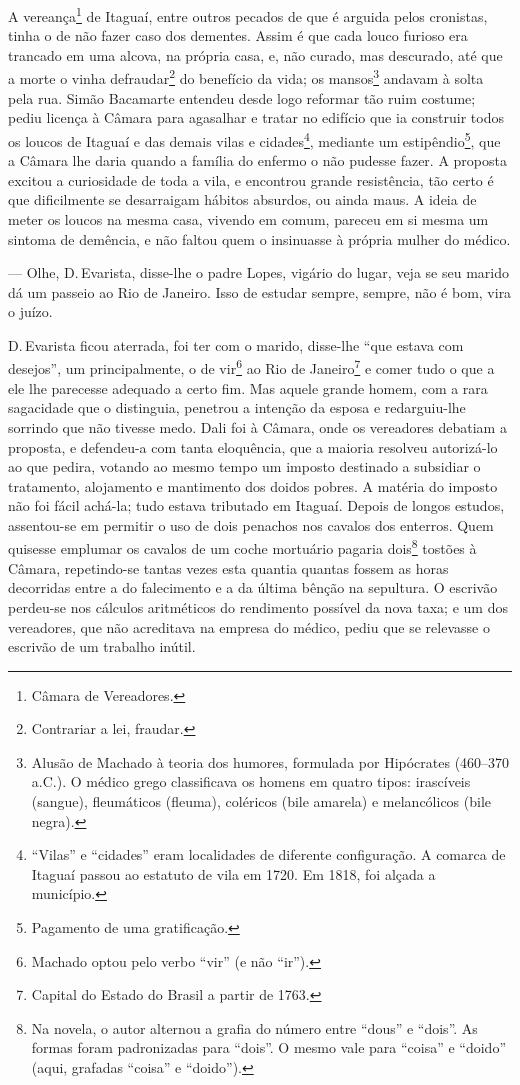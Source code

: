 A vereança\footnote{Câmara de Vereadores.} de Itaguaí, entre outros
pecados de que é arguida pelos cronistas, tinha o de não fazer caso dos
dementes. Assim é que cada louco furioso era trancado em uma alcova, na
própria casa, e, não curado, mas descurado, até que a morte o vinha
defraudar\footnote{Contrariar a lei, fraudar.} do benefício da vida; os
mansos\footnote{Alusão de Machado à teoria dos humores, formulada por
  Hipócrates (460--370 a.C.). O médico grego classificava os homens em
  quatro tipos: irascíveis (sangue), fleumáticos (fleuma), coléricos
  (bile amarela) e melancólicos (bile negra).} andavam à solta pela rua.
Simão Bacamarte entendeu desde logo reformar tão ruim costume; pediu
licença à Câmara para agasalhar e tratar no edifício que ia construir
todos os loucos de Itaguaí e das demais vilas e cidades\footnote{``Vilas''
  e ``cidades'' eram localidades de diferente configuração. A comarca de
  Itaguaí passou ao estatuto de vila em 1720. Em 1818, foi alçada a
  município.}, mediante um estipêndio\footnote{Pagamento de uma
  gratificação.}, que a Câmara lhe daria quando a família do enfermo o
não pudesse fazer. A proposta excitou a curiosidade de toda a vila, e
encontrou grande resistência, tão certo é que dificilmente se
desarraigam hábitos absurdos, ou ainda maus. A ideia de meter os loucos
na mesma casa, vivendo em comum, pareceu em si mesma um sintoma de
demência, e não faltou quem o insinuasse à própria mulher do médico.

--- Olhe, D.\,Evarista, disse-lhe o padre Lopes, vigário do lugar, veja
se seu marido dá um passeio ao Rio de Janeiro. Isso de estudar sempre,
sempre, não é bom, vira o juízo.

D.\,Evarista ficou aterrada, foi ter com o marido, disse-lhe ``que estava
com desejos'', um principalmente, o de vir\footnote{Machado optou pelo
  verbo ``vir'' (e não ``ir'').} ao Rio de Janeiro\footnote{Capital do
  Estado do Brasil a partir de 1763.} e comer tudo o que a ele lhe
parecesse adequado a certo fim. Mas aquele grande homem, com a rara
sagacidade que o distinguia, penetrou a intenção da esposa e
redarguiu-lhe sorrindo que não tivesse medo. Dali foi à Câmara, onde os
vereadores debatiam a proposta, e defendeu-a com tanta eloquência, que a
maioria resolveu autorizá-lo ao que pedira, votando ao mesmo tempo um
imposto destinado a subsidiar o tratamento, alojamento e mantimento dos
doidos pobres. A matéria do imposto não foi fácil achá-la; tudo estava
tributado em Itaguaí. Depois de longos estudos, assentou-se em permitir
o uso de dois penachos nos cavalos dos enterros. Quem quisesse emplumar
os cavalos de um coche mortuário pagaria dois\footnote{Na novela, o
  autor alternou a grafia do número entre ``dous'' e ``dois''. As formas
  foram padronizadas para ``dois''. O mesmo vale para ``coisa'' e
  ``doido'' (aqui, grafadas ``coisa'' e ``doido'').} tostões à Câmara,
repetindo-se tantas vezes esta quantia quantas fossem as horas
decorridas entre a do falecimento e a da última bênção na sepultura. O
escrivão perdeu-se nos cálculos aritméticos do rendimento possível da
nova taxa; e um dos vereadores, que não acreditava na empresa do médico,
pediu que se relevasse o escrivão de um trabalho inútil.

